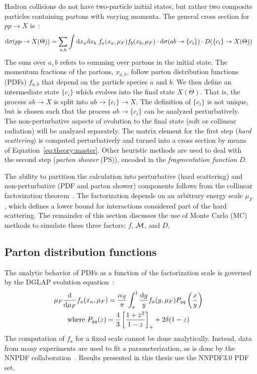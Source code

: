 Hadron collisions do not have two-particle initial states, but rather two composite particles containing partons with varying momenta. 
The general cross section for $pp\rightarrow X$ is~\cite{tasi009}:
\begin{equation}
\mathrm{d}\sigma(pp\rightarrow X(\Theta)) = 
    \sum_{a,b} \int \mathrm{d}x_a \mathrm{d}x_b 
    ~f_a(x_a,\mu_F) f_b(x_b,\mu_F) 
    \cdot \mathrm{d}\sigma(ab\rightarrow\{c_i\}) 
    \cdot D(\{c_i\}\rightarrow X(\Theta))
    \label{eq:theory:master}
\end{equation}
The sum over $a,b$ refers to summing over partons in the initial state.
The momentum fractions of the partons, $x_{a,b}$, follow parton distribution functions (PDFs) $f_{a,b}$ that depend on the particle species $a$ and $b$. 
We then define an intermediate state $\{c_i\}$ which evolves into the final state $X(\Theta)$.
That is, the process $ab\rightarrow X$ is split into $ab\rightarrow \{c_i\} \rightarrow X$.
The definition of $\{c_i\}$ is not unique, but is chosen such that the process $ab\rightarrow\{c_i\}$ can be analyzed perturbatively.
The non-perturbative aspects of evolution to the final state (soft or collinear radiation) will be analyzed separately. 
The matrix element for the first step (\emph{hard scattering}) is computed perturbatively and turned into a cross section by means of Equation~\ref{eq:theory:master}.
Other heuristic methods are used to deal with the second step (\emph{parton shower} (PS)), encoded in the \emph{fragmentation function} $D$. 

The ability to partition the calculation into perturbative (hard scattering) and non-perturbative (PDF and parton shower) components follows from the collinear factorization theorem~\cite{fact}.
The factorization depends on an arbitrary energy scale $\mu_F$, which defines a lower bound for interactions considered part of the hard scattering. 
The remainder of this section discusses the use of Monte Carlo (MC) methods to simulate these three factors: $f$, $\mathcal{M}$, and $D$.

\subsection{Parton distribution functions}
The analytic behavior of PDFs as a function of the factorization scale is governed by the DGLAP evolution equation~\cite{dglap1,dglap2,dglap3}:
\begin{gather}
    \mu_F \frac{\mathrm{d}}{\mathrm{d}\mu_F} f_a(x_a,\mu_F) = \frac{\alpha_S}{\pi} \int_x^1 \frac{\mathrm{d} y}{y} f_a(y,\mu_F) P_{qq} \left(\frac{x}{y}\right) \\
    \text{where } P_{qq}(z) = \frac{4}{3}\left[\frac{1+z^2}{1-z}\right]_+ + 2\delta(1-z) \nonumber 
    \label{eq:theory:dglap}
\end{gather}
The computation of $f_a$ for a fixed scale cannot be done analytically.
Instead, data from many experiments are used to fit a parameterization, as is done by the NNPDF collaboration~\cite{nnpdf}.
Results presented in this thesis use the NNPDF3.0 PDF set.

